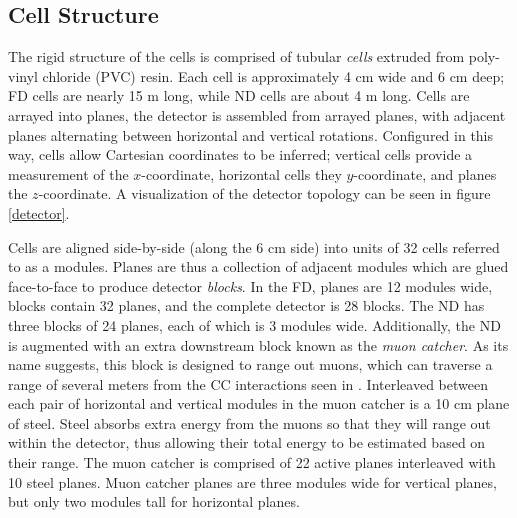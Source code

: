 \subsection{Cell Structure}

 The rigid structure of the cells is comprised of tubular \textit{cells} extruded from poly-vinyl chloride (PVC) resin.  Each cell is approximately 4 cm wide and 6 cm deep; FD cells are nearly 15 m long, while ND cells are about 4 m long.  Cells are arrayed into planes, the detector is assembled from arrayed planes, with adjacent planes alternating between horizontal and vertical rotations.  Configured in this way, cells allow Cartesian coordinates to be inferred; vertical cells provide a measurement of the $x$-coordinate, horizontal cells they $y$-coordinate, and planes the $z$-coordinate.  A visualization of the detector topology can be seen in figure \ref{detector}.

 Cells are aligned side-by-side (along the 6 cm side) into units of 32 cells referred to as a modules.  Planes are thus a collection of adjacent modules which are glued face-to-face to produce detector \textit{blocks}.  In the FD, planes are 12 modules wide, blocks contain 32 planes, and the complete detector is 28 blocks.  The ND has three blocks of 24 planes, each of which is 3 modules wide.  Additionally, the ND is augmented with an extra downstream block known as the \textit{muon catcher}.  As its name suggests, this block is designed to range out muons, which can traverse a range of several meters from the \numu CC interactions seen  in \nova.  Interleaved between each pair of horizontal and vertical modules in the muon catcher is a 10 cm plane of steel.  Steel absorbs extra energy from the muons so that they will range out within the detector, thus allowing their total energy to be estimated based on their range.  The muon catcher is comprised of 22 active planes interleaved with 10 steel planes.  Muon catcher planes are three modules wide for vertical planes, but only two modules tall for horizontal planes.

